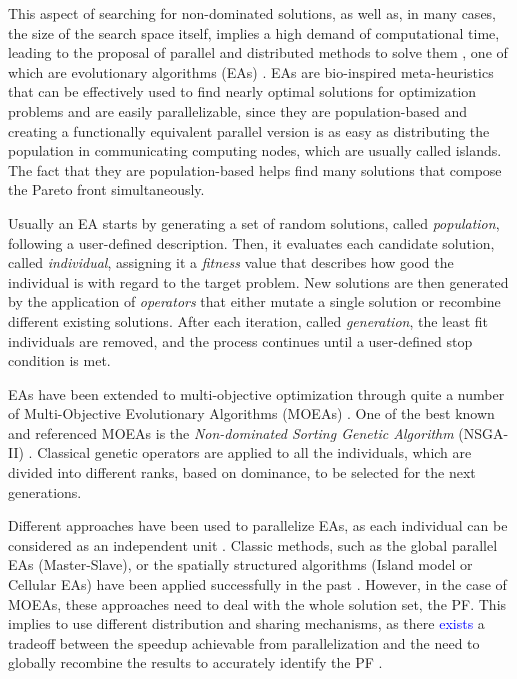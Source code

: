\documentclass[preprint]{elsarticle}
\begin{document}
This aspect of searching for non-dominated solutions, as well as, in
many cases, the size of the search space itself, implies a high demand
of computational time, leading to the proposal of parallel and distributed methods to solve them
\citep{Luna15Survey,Mukhopadhyay14Survey,Chavez15MO,Hidalgo16residualstress,KAUR2018183,XU2018268},
one of which are evolutionary algorithms (EAs)
\citep{DBLP:series/ncs/EibenS15}. EAs are bio-inspired meta-heuristics
that can be effectively used to find nearly optimal solutions for
optimization problems and are easily parallelizable, since they are
population-based and creating a functionally equivalent parallel
version is as easy as distributing the population in communicating
computing nodes, which are usually called islands. The fact that
they are population-based helps find many solutions that compose the
Pareto front simultaneously.


Usually an EA starts by generating a set of random solutions, called
\emph{population}, following a user-defined description. Then, it
evaluates each candidate solution, called \emph{individual}, assigning
it a \emph{fitness} value that describes how good the individual is
with regard to the target problem. New solutions are then generated by
the application of \emph{operators} that either mutate a single
solution or recombine different existing solutions. After each
iteration, called \emph{generation}, the least fit individuals are
removed, and the process continues until a user-defined stop condition
is met.

EAs have been extended to multi-objective optimization through quite a number of Multi-Objective Evolutionary Algorithms (MOEAs) \cite{TalbiUnified2018}.
One of the best known and referenced MOEAs
\citep{Dorronsoro13superlinear} is the {\em 
  Non-dominated Sorting Genetic Algorithm} (NSGA-II)
\citep{Deb00NSGAII}. Classical genetic operators are applied to all
the individuals, which are divided into different ranks, based on 
dominance, to be selected for the next generations.



Different approaches have been used to parallelize EAs, as each individual can be considered as an
independent unit \citep{Alba13parallel,Gong15models}. Classic methods, such as the
global parallel EAs (Master-Slave), or the spatially structured
algorithms (Island model or Cellular EAs) have been applied
successfully in the past \citep{Folino03cellular,Alba02Parallelism}.
However, in the case of MOEAs, these
approaches \citep{Luna15Survey} need to deal with the whole solution set, the PF.
 This implies to use different distribution
and sharing mechanisms, as there \textcolor{blue}{exists} a tradeoff between the speedup
achievable from parallelization and the need to globally recombine the
results to accurately identify the PF
\citep{Branke04Parallelizingcone}. %
\end{document}
